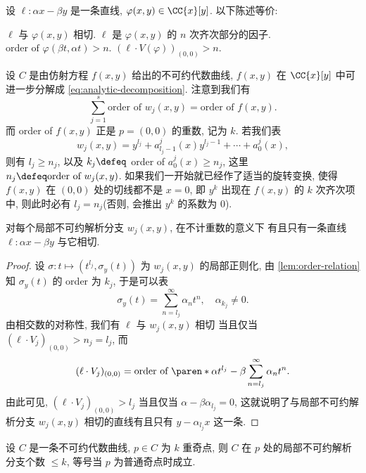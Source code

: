 \begin{prop}[相切的刻画]
\label{prop:tangent-chara}
设 $\ell: \alpha x - \beta y$ 是一条直线,
$\varphi(x,y) \in \CC\{x\}[y]$. 以下陈述等价:
\begin{enumerate}[label=\normalfont(\arabic*)]
    \ii $\ell$ 与 $\varphi(x,y)$ 相切.
    \ii $\ell$ 是 $\varphi(x,y)$ 的 $n$ 次齐次部分的因子.
    \ii $\text{order of }\varphi(\beta t,\alpha t) > n$.
    \ii $(\ell\cdot V(\varphi))_{(0,0)} > n$.
\end{enumerate}
\end{prop}

设 $C$ 是由仿射方程 $f(x,y)$ 给出的不可约代数曲线,
$f(x,y)$ 在 $\CC\{x\}[y]$ 中可进一步分解成 \cref{eq:analytic-decomposition}.
注意到我们有
\begin{equation}
\label{eq:order-sum-relation}
\sum_{j=1}^s \text{order of $w_j(x,y)$} = \text{order of $f(x,y)$}.
\end{equation}
而 order of $f(x,y)$ 正是 $p = (0,0)$ 的重数, 记为 $k$.
若我们表
\[w_j(x,y) = y^{l_j} + a_{l_j-1}^j(x)y^{l_j - 1} + \cdots + a_0^j(x),\]
则有 $l_j \ge n_j$, 以及 $k_j\defeq$ order of $a_0^j(x) \ge n_j$,
这里 $n_j \defeq \text{order of }w_j(x,y)$.
如果我们一开始就已经作了适当的旋转变换,
使得 $f(x,y)$ 在 $(0,0)$ 处的切线都不是 $x = 0$,
即 $y^k$ 出现在 $f(x,y)$ 的 $k$ 次齐次项中,
则此时必有 $l_j = n_j$(否则, 会推出 $y^k$ 的系数为 $0$).

\begin{prop}
\label{prop:only-one-tangent}
对每个局部不可约解析分支 $w_j(x,y)$, 在不计重数的意义下
有且只有一条直线 $\ell: \alpha x - \beta y$ 与它相切.
\end{prop}

\begin{proof}
设 $\sigma: t \mapsto (t^{l_j}, \sigma_y(t))$ 为 $w_j(x,y)$ 的局部正则化,
由 \cref{lem:order-relation} 知 $\sigma_y(t)$ 的 order 为 $k_j$, 于是可以表
\[\sigma_y(t) = \sum_{n = l_j}^\infty \alpha_nt^n,\quad \alpha_{k_j} \ne 0.\]
由相交数的对称性,
我们有 $\ell$ 与 $w_j(x,y)$ 相切
当且仅当 $(\ell \cdot V_j)_{(0,0)} > n_j = l_j$, 而
\[(\ell\cdot V_j)_{(0,0)} = \text{order of }\paren*{\alpha t^{l_j} - \beta \sum_{n=l_j}^\infty \alpha_nt^n}.\]
由此可见, $(\ell\cdot V_j)_{(0,0)} > l_j$ 当且仅当 $\alpha - \beta\alpha_{l_j} = 0$,
这就说明了与局部不可约解析分支 $w_j(x,y)$ 相切的直线有且只有
$y - \alpha_{l_j}x$ 这一条.
\end{proof}

\begin{cor}
\label{cor:ordinary}
设 $C$ 是一条不可约代数曲线, $p \in C$ 为 $k$ 重奇点,
则 $C$ 在 $p$ 处的局部不可约解析分支个数 $\le k$,
等号当 $p$ 为普通奇点时成立.
\end{cor}

